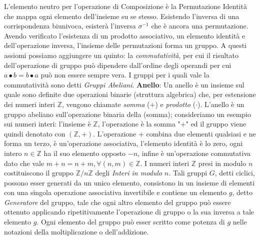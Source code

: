 \documentclass[a4paper,12pt]{tesiinfo}
\begin{document}
\newline
L'elemento neutro per l'operazione di Composizione \`e la Permutazione Identit\`a che mappa ogni elemento dell'insieme su se stesso. 
\newline
Esistendo l'inversa di una corrispondenza biunivoca, esister\`a l'inversa $ \sigma ^ {-1} $ che \`e ancora una permutazione.
\newline
Avendo verificato l'esistenza di un prodotto associativo, un elemento identit\`a e dell'operazione inversa, l'insieme delle permutazioni forma un gruppo.
%
%
%
\newline\newline
A questi assiomi possiamo aggiungere un quinto: la \textit{commutativit\`a}, per cui il risultato dell'operazione di gruppo pu\`o dipendere dall'ordine degli operandi per cui $ a \bullet b = b \bullet a$ pu\`o non essere sempre vera. 
\newline
I gruppi per i quali vale la commutativit\`a sono detti \textit{Gruppi Abeliani}.
\newline\newline
%
%
%
\textbf{Anello}: Un anello \`e un insieme sul quale sono definite due operazioni binarie (struttura algebrica) che, per estensione dei numeri interi $\mathbb{Z}$, vengono chiamate \textit{somma} ($+$) e \textit{prodotto} ($\cdot$). L'anello \`e un gruppo abeliano sull'operazione binaria della (somma); consideriamo un esempio sui numeri interi: l'insieme \`e $\mathbb{Z}$, l'operazione \`e la somma "+" ed il gruppo viene quindi denotato con $(\mathbb{Z}, +)$. L'operazione + combina due elementi qualsiasi e ne forma un terzo, \`e un'operazione associativa, l'elemento identit\`a \`e lo zero, ogni intero $n \in \mathbb{Z}$ ha il suo elemento opposto $-n$, infine \`e un'operazione commutativa dato che vale $m + n = n + m, \forall (n, m) \in \mathbb{Z}$.
\newline
I numeri interi $\mathbb{Z}$ presi in modulo $n$ costituiscono il gruppo $\mathbb{Z}/ n \mathbb{Z}$ degli \textit{Interi in modulo $n$}. Tali gruppi $G$, detti ciclici, possono esser generati da un unico elemento, consistono in un insieme di elementi con una singola operazione associativa invertibile e contiene un elemento $g$, detto \textit{Generatore} del gruppo, tale che ogni altro elemento del gruppo pu\`o essere ottenuto applicando ripetitivamente l'operazione di gruppo o la sua inversa a tale elemento $g$. Ogni elemento del gruppo pu\`o esser scritto come potenza di $g$ nelle notazioni della moltiplicazione o dell'addizione.
\newline
\end{document}
